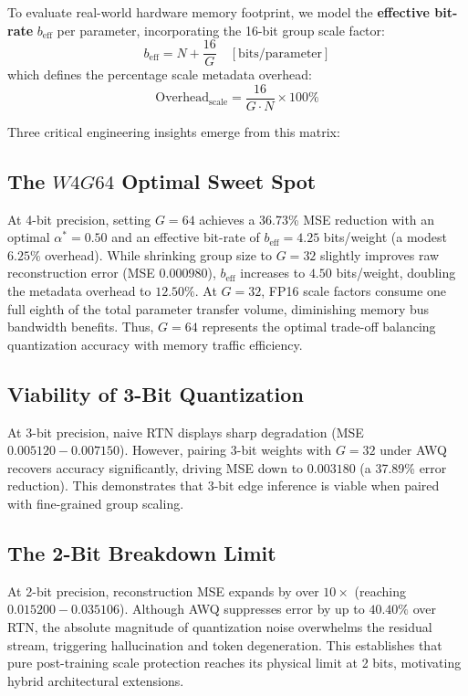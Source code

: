 \documentclass[conference]{IEEEtran}
\begin{document}
To evaluate real-world hardware memory footprint, we model the \textbf{effective bit-rate} $b_{\text{eff}}$ per parameter, incorporating the 16-bit group scale factor:
\begin{equation}
b_{\text{eff}} = N + \frac{16}{G} \quad [\text{bits/parameter}]
\end{equation}
which defines the percentage scale metadata overhead:
\begin{equation}
\text{Overhead}_{\text{scale}} = \frac{16}{G \cdot N} \times 100\%
\end{equation}

Three critical engineering insights emerge from this matrix:

\subsection{The \texorpdfstring{$W4G64$}{W4G64} Optimal Sweet Spot}
At 4-bit precision, setting $G=64$ achieves a 36.73\% MSE reduction with an optimal $\alpha^* = 0.50$ and an effective bit-rate of $b_{\text{eff}} = 4.25$ bits/weight (a modest $6.25\%$ overhead). While shrinking group size to $G=32$ slightly improves raw reconstruction error (MSE 0.000980), $b_{\text{eff}}$ increases to $4.50$ bits/weight, doubling the metadata overhead to $12.50\%$. At $G=32$, FP16 scale factors consume one full eighth of the total parameter transfer volume, diminishing memory bus bandwidth benefits. Thus, $G=64$ represents the optimal trade-off balancing quantization accuracy with memory traffic efficiency.

\subsection{Viability of 3-Bit Quantization}
At 3-bit precision, naive RTN displays sharp degradation (MSE $0.005120 - 0.007150$). However, pairing 3-bit weights with $G=32$ under AWQ recovers accuracy significantly, driving MSE down to $0.003180$ (a 37.89\% error reduction). This demonstrates that 3-bit edge inference is viable when paired with fine-grained group scaling.

\subsection{The 2-Bit Breakdown Limit}
At 2-bit precision, reconstruction MSE expands by over $10\times$ (reaching $0.015200 - 0.035106$). Although AWQ suppresses error by up to $40.40\%$ over RTN, the absolute magnitude of quantization noise overwhelms the residual stream, triggering hallucination and token degeneration. This establishes that pure post-training scale protection reaches its physical limit at 2 bits, motivating hybrid architectural extensions.
\end{document}
